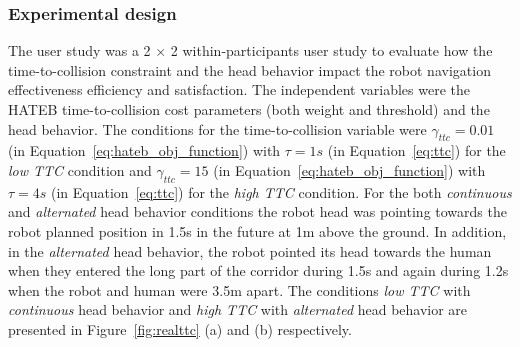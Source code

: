 \documentclass[a4paper,11pt,twoside]{StyleThese}
\begin{document}
\subsubsection{Experimental design}
The user study was a 2 $\times$ 2 within-participants user study to evaluate how the time-to-collision constraint and the head behavior impact the robot navigation effectiveness efficiency and satisfaction. The independent variables were the HATEB time-to-collision cost parameters (both weight and threshold) and the head behavior. The conditions for the time-to-collision variable were $\gamma_{ttc} = 0.01$ (in Equation~\ref{eq:hateb_obj_function}) with $\tau = 1s$ (in Equation~\ref{eq:ttc})  for the \textit{low TTC} condition and $\gamma_{ttc} = 15$ (in Equation~\ref{eq:hateb_obj_function}) with $\tau = 4s$ (in Equation~\ref{eq:ttc}) for the \textit{high TTC} condition. For the both \textit{continuous} and \textit{alternated} head behavior conditions the robot head was pointing towards the robot planned position in 1.5s in the future at 1m above the ground. In addition, in the \textit{alternated} head behavior, the robot pointed its head towards the human when they entered the long part of the corridor during 1.5s and again during 1.2s when the robot and human were 3.5m apart. The conditions \textit{low TTC} with \textit{continuous} head behavior and \textit{high TTC} with \textit{alternated} head behavior are presented in Figure~\ref{fig:realttc} (a) and (b) respectively.
\end{document}
